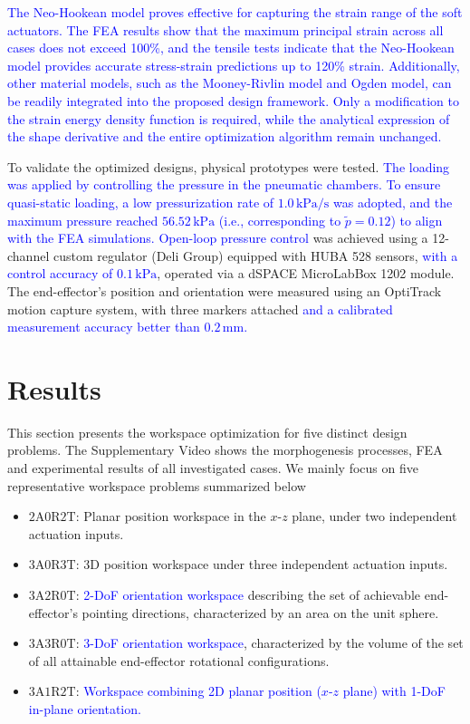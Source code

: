 \documentclass[journal]{IEEEtran}
\theoremstyle{definition}
\begin{document}
\textcolor{blue}{The Neo-Hookean model proves effective for capturing the strain range of the soft actuators. The FEA results show that the maximum principal strain across all cases does not exceed 100\%, and the tensile tests indicate that the Neo-Hookean model provides accurate stress-strain predictions up to 120\% strain. Additionally, other material models, such as the Mooney-Rivlin model and Ogden model, can be readily integrated into the proposed design framework. Only a modification to the strain energy density function is required, while the analytical expression of the shape derivative and the entire optimization algorithm remain unchanged.}

To validate the optimized designs, physical prototypes were tested. \textcolor{blue}{The loading was applied by controlling the pressure in the pneumatic chambers. To ensure quasi-static loading, a low pressurization rate of $1.0\,\text{kPa/s}$ was adopted, and the maximum pressure reached $56.52\,\text{kPa}$ (i.e., corresponding to $\tilde{p}=0.12$) to align with the FEA simulations.} \textcolor{blue}{Open-loop pressure control} was achieved using a 12-channel custom regulator (Deli Group) equipped with HUBA 528 sensors, \textcolor{blue}{with a control accuracy of $0.1\,\text{kPa}$}, operated via a dSPACE MicroLabBox 1202 module. The end-effector's position and orientation were measured using an OptiTrack motion capture system, with three markers attached \textcolor{blue}{and a calibrated measurement accuracy better than $0.2\,\text{mm}$.}

\section{Results}
\label{sec:results}

This section presents the workspace optimization for five distinct design problems. The Supplementary Video shows the morphogenesis processes, FEA and experimental results of all investigated cases. We mainly focus on five representative workspace problems summarized below
\begin{itemize}
    \item $2\text{A}0\text{R}2\text{T}$: Planar position workspace in the $x$-$z$ plane, under two independent actuation inputs.
    \item $3\text{A}0\text{R}3\text{T}$: 3D position workspace under three independent actuation inputs.
    \item $3\text{A}2\text{R}0\text{T}$: \textcolor{blue}{2-DoF orientation workspace} describing the set of achievable end-effector's pointing directions, characterized by an area on the unit sphere.
    \item $3\text{A}3\text{R}0\text{T}$: \textcolor{blue}{3-DoF orientation workspace}, characterized by the volume of the set of all attainable end-effector rotational configurations.
    \item $3\text{A}1\text{R}2\text{T}$: \textcolor{blue}{Workspace combining 2D planar position ($x$-$z$ plane) with 1-DoF in-plane orientation.}
\end{itemize}
\end{document}

